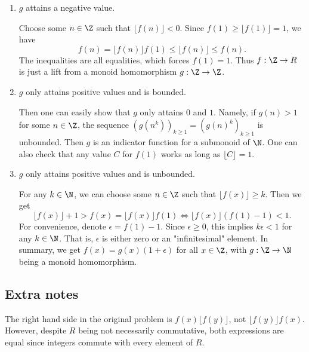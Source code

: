 \begin{enumerate}

    \item 
    $g$ attains a negative value.

    Choose some $n \in \Z$ such that $\lfloor f(n) \rfloor < 0$.
    Since $f(1) \geq \lfloor f(1) \rfloor = 1$, we have
    \[ f(n) = \lfloor f(n) \rfloor f(1) \leq \lfloor f(n) \rfloor \leq f(n). \]
    The inequalities are all equalities, which forces $f(1) = 1$.
    Thus $f : \Z \to R$ is just a lift from a monoid homomorphism $g : \Z \to \Z$.

    \item
    $g$ only attains positive values and is bounded.

    Then one can easily show that $g$ only attains $0$ and $1$.
    Namely, if $g(n) > 1$ for some $n \in \Z$, the sequence $(g(n^k))_{k \geq 1} = (g(n)^k)_{k \geq 1}$ is unbounded.
    Then $g$ is an indicator function for a submonoid of $\N$.
    One can also check that any value $C$ for $f(1)$ works as long as $\lfloor C \rfloor = 1$.

    \item
    $g$ only attains positive values and is unbounded.

    For any $k \in \N$, we can choose some $n \in \Z$ such that $\lfloor f(x) \rfloor \geq k$.
    Then we get
    \[ \lfloor f(x) \rfloor + 1 > f(x) = \lfloor f(x) \rfloor f(1) \iff \lfloor f(x) \rfloor (f(1) - 1) < 1. \]
    For convenience, denote $\epsilon = f(1) - 1$.
    Since $\epsilon \geq 0$, this implies $k \epsilon < 1$ for any $k \in \N$.
    That is, $\epsilon$ is either zero or an "infinitesimal" element.
    In summary, we get $f(x) = g(x) (1 + \epsilon)$ for all $x \in \Z$, with $g : \Z \to \N$ being a monoid homomorphism.

\end{enumerate}



\subsection*{Extra notes}

The right hand side in the original problem is $f(x) \lfloor f(y) \rfloor$, not $\lfloor f(y) \rfloor f(x)$.
However, despite $R$ being not necessarily commutative, both expressions are equal since integers commute with every element of $R$.
